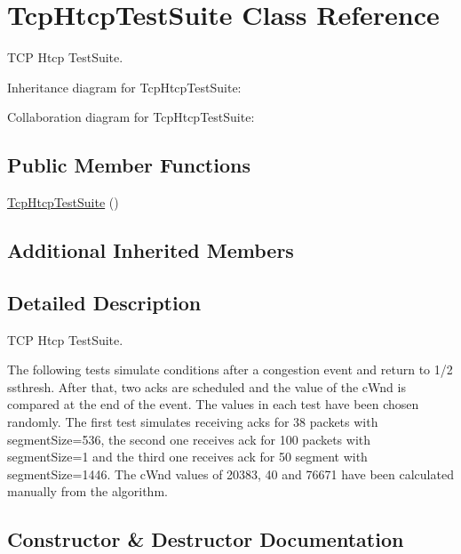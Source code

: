 \hypertarget{classTcpHtcpTestSuite}{}\section{Tcp\+Htcp\+Test\+Suite Class Reference}
\label{classTcpHtcpTestSuite}


T\+CP Htcp Test\+Suite.  




Inheritance diagram for Tcp\+Htcp\+Test\+Suite\+:


Collaboration diagram for Tcp\+Htcp\+Test\+Suite\+:
\subsection*{Public Member Functions}
\begin{DoxyCompactItemize}
\item 
\hyperlink{classTcpHtcpTestSuite_a194239641e79f73ec775fc415d8119a2}{Tcp\+Htcp\+Test\+Suite} ()
\end{DoxyCompactItemize}
\subsection*{Additional Inherited Members}


\subsection{Detailed Description}
T\+CP Htcp Test\+Suite. 

The following tests simulate conditions after a congestion event and return to 1/2 ssthresh. After that, two acks are scheduled and the value of the c\+Wnd is compared at the end of the event. The values in each test have been chosen randomly. The first test simulates receiving acks for 38 packets with segment\+Size=536, the second one receives ack for 100 packets with segment\+Size=1 and the third one receives ack for 50 segment with segment\+Size=1446. The c\+Wnd values of 20383, 40 and 76671 have been calculated manually from the algorithm. 

\subsection{Constructor \& Destructor Documentation}
